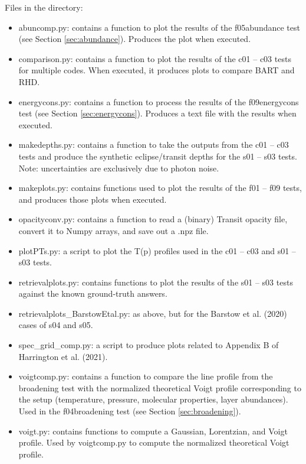 \documentclass[letterpaper, 12pt]{article}
\begin{document}
Files in the directory:
\begin{itemize} \itemsep0pt
  \item abuncomp.py: contains a function to plot the results of the f05abundance test (see Section \ref{sec:abundance}). Produces the plot when executed.
  \item comparison.py: contains a function to plot the results of the c01 -- c03 tests for multiple 
        codes. When executed, it produces plots to compare BART and RHD.
  \item energycons.py: contains a function to process the results of the f09energycons test (see Section \ref{sec:energycons}). Produces a text file with the results when executed.
  \item makedepths.py: contains a function to take the outputs from the c01 -- c03 tests and produce the synthetic eclipse/transit depths for the s01 -- s03 tests. Note: uncertainties are exclusively due to photon noise.
  \item makeplots.py: contains functions used to plot the results of the f01 -- f09 tests, 
        and produces those plots when executed.
  \item opacityconv.py: contains a function to read a (binary) Transit opacity 
        file, convert it to Numpy arrays, and save out a .npz file.
  \item plotPTs.py: a script to plot the T(p) profiles used in the c01 -- c03 and s01 -- s03 tests.
  \item retrievalplots.py: contains functions to plot the results of the s01 -- s03 tests against the known ground-truth answers.
  \item retrievalplots{\_}BarstowEtal.py: as above, but for the Barstow et al. (2020) cases of s04 and s05.
  \item spec{\_}grid{\_}comp.py: a script to produce plots related to Appendix B of Harrington et al. (2021).
  \item voigtcomp.py: contains a function to compare the line profile from the 
        broadening test with the normalized theoretical Voigt profile 
        corresponding to the setup (temperature, pressure, molecular 
        properties, layer abundances). Used in the f04broadening test (see 
        Section \ref{sec:broadening}).
  \item voigt.py: contains functions to compute a Gaussian, Lorentzian, and 
        Voigt profile. Used by voigtcomp.py to compute the normalized 
        theoretical Voigt profile.
\end{itemize}
\end{document}
